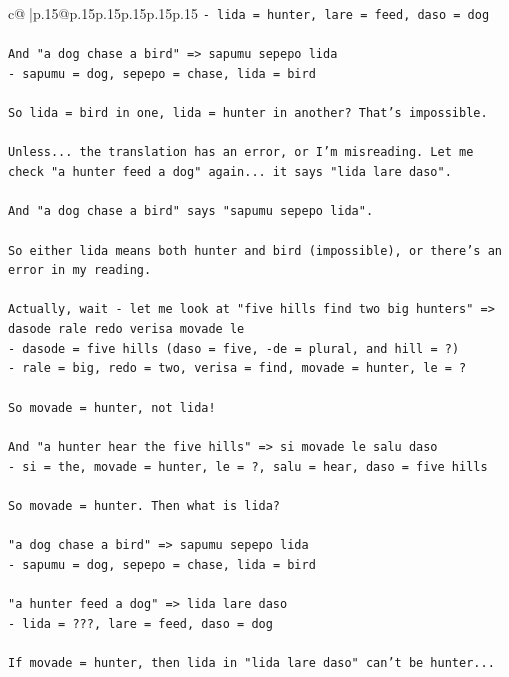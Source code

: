 \documentclass{article}
\begin{document}
{\begin{supertabular}{c@{$\;$}|p{.15\linewidth}@{}p{.15\linewidth}p{.15\linewidth}p{.15\linewidth}p{.15\linewidth}p{.15\linewidth}}
{{{\texttt{{-} lida = hunter, lare = feed, daso = dog} \\
\\ 
\texttt{And "a dog chase a bird" => sapumu sepepo lida} \\
\texttt{{-} sapumu = dog, sepepo = chase, lida = bird} \\
\\ 
\texttt{So lida = bird in one, lida = hunter in another? That's impossible.} \\
\\ 
\texttt{Unless... the translation has an error, or I'm misreading. Let me check "a hunter feed a dog" again... it says "lida lare daso".} \\
\\ 
\texttt{And "a dog chase a bird" says "sapumu sepepo lida".} \\
\\ 
\texttt{So either lida means both hunter and bird (impossible), or there's an error in my reading.} \\
\\ 
\texttt{Actually, wait {-} let me look at "five hills find two big hunters" => dasode rale redo verisa movade le} \\
\texttt{{-} dasode = five hills (daso = five, {-}de = plural, and hill = ?)} \\
\texttt{{-} rale = big, redo = two, verisa = find, movade = hunter, le = ?} \\
\\ 
\texttt{So movade = hunter, not lida!} \\
\\ 
\texttt{And "a hunter hear the five hills" => si movade le salu daso} \\
\texttt{{-} si = the, movade = hunter, le = ?, salu = hear, daso = five hills} \\
\\ 
\texttt{So movade = hunter. Then what is lida?} \\
\\ 
\texttt{"a dog chase a bird" => sapumu sepepo lida} \\
\texttt{{-} sapumu = dog, sepepo = chase, lida = bird} \\
\\ 
\texttt{"a hunter feed a dog" => lida lare daso} \\
\texttt{{-} lida = ???, lare = feed, daso = dog} \\
\\ 
\texttt{If movade = hunter, then lida in "lida lare daso" can't be hunter...} \\
}}}
\end{supertabular}}
\end{document}

